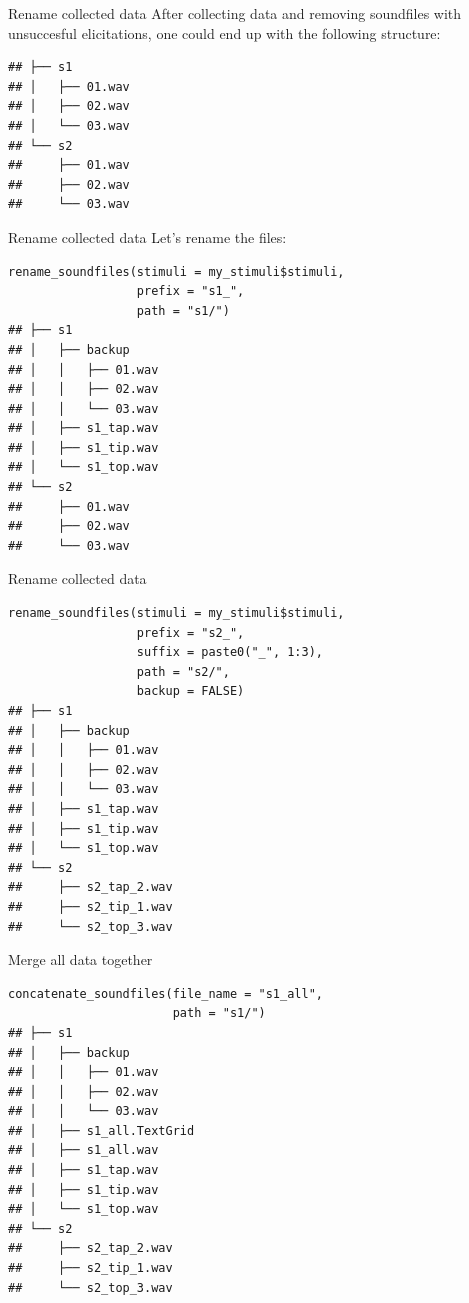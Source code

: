 \documentclass[13pt, t]{beamer}
\begin{document}
\begin{frame}[fragile]{Rename collected data}
After collecting data and removing soundfiles with unsuccesful elicitations, one could end up with the following structure:
\begin{verbatim}
## ├── s1
## │   ├── 01.wav
## │   ├── 02.wav
## │   └── 03.wav
## └── s2
##     ├── 01.wav
##     ├── 02.wav
##     └── 03.wav
\end{verbatim}
\end{frame}

\begin{frame}[fragile]{Rename collected data}
Let's rename the files:
\begin{verbatim}
rename_soundfiles(stimuli = my_stimuli$stimuli,
                  prefix = "s1_",
                  path = "s1/")
## ├── s1
## │   ├── backup
## │   │   ├── 01.wav
## │   │   ├── 02.wav
## │   │   └── 03.wav
## │   ├── s1_tap.wav
## │   ├── s1_tip.wav
## │   └── s1_top.wav
## └── s2
##     ├── 01.wav
##     ├── 02.wav
##     └── 03.wav
\end{verbatim}
\end{frame}

\begin{frame}[fragile]{Rename collected data}
\begin{verbatim}
rename_soundfiles(stimuli = my_stimuli$stimuli,
                  prefix = "s2_",
                  suffix = paste0("_", 1:3),
                  path = "s2/",
                  backup = FALSE)
## ├── s1
## │   ├── backup
## │   │   ├── 01.wav
## │   │   ├── 02.wav
## │   │   └── 03.wav
## │   ├── s1_tap.wav
## │   ├── s1_tip.wav
## │   └── s1_top.wav
## └── s2
##     ├── s2_tap_2.wav
##     ├── s2_tip_1.wav
##     └── s2_top_3.wav                  
\end{verbatim}
\end{frame}

\begin{frame}[fragile]{Merge all data together}
\begin{verbatim}
concatenate_soundfiles(file_name = "s1_all",
                       path = "s1/")
## ├── s1
## │   ├── backup
## │   │   ├── 01.wav
## │   │   ├── 02.wav
## │   │   └── 03.wav
## │   ├── s1_all.TextGrid
## │   ├── s1_all.wav
## │   ├── s1_tap.wav
## │   ├── s1_tip.wav
## │   └── s1_top.wav
## └── s2
##     ├── s2_tap_2.wav
##     ├── s2_tip_1.wav
##     └── s2_top_3.wav                       
\end{verbatim}
\end{frame}
\end{document}
